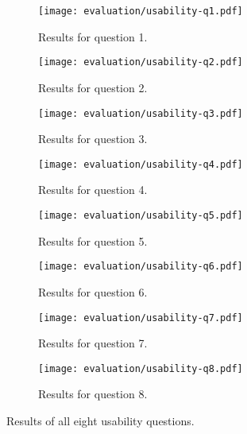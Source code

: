 \begin{figure}[h]
	\centering
	\begin{subfigure}{.49\textwidth}
  		\centering
  		\texttt{[image: evaluation/usability-q1.pdf]}
  		\caption{Results for question 1.}
	\end{subfigure}%
	\begin{subfigure}{.49\textwidth}
  		\centering
  		\texttt{[image: evaluation/usability-q2.pdf]}
  		\caption{Results for question 2.}
	\end{subfigure}\par\bigskip
	
	\begin{subfigure}{.49\textwidth}
  		\centering
  		\texttt{[image: evaluation/usability-q3.pdf]}
  		\caption{Results for question 3.}
	\end{subfigure}%
	\begin{subfigure}{.49\textwidth}
  		\centering
  		\texttt{[image: evaluation/usability-q4.pdf]}
  		\caption{Results for question 4.}
	\end{subfigure}\par\bigskip
	
	\begin{subfigure}{.49\textwidth}
  		\centering
  		\texttt{[image: evaluation/usability-q5.pdf]}
  		\caption{Results for question 5.}
	\end{subfigure}%
	\begin{subfigure}{.49\textwidth}
  		\centering
  		\texttt{[image: evaluation/usability-q6.pdf]}
  		\caption{Results for question 6.}
	\end{subfigure}\par\bigskip
	
	\begin{subfigure}{.49\textwidth}
  		\centering
  		\texttt{[image: evaluation/usability-q7.pdf]}
  		\caption{Results for question 7.}
	\end{subfigure}%
	\begin{subfigure}{.49\textwidth}
  		\centering
  		\texttt{[image: evaluation/usability-q8.pdf]}
  		\caption{Results for question 8.}
	\end{subfigure}
	\caption{Results of all eight usability questions.}
\end{figure}


